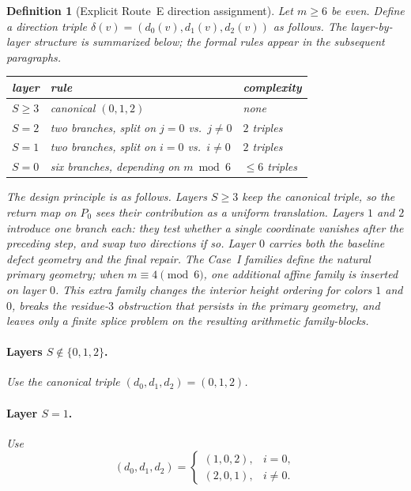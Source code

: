 \documentclass[11pt]{article}
\newtheorem{definition}{Definition}
\begin{document}
\begin{definition}[Explicit Route~E direction assignment]\label{def:routeE}
Let $m\ge 6$ be even. Define a direction triple $\delta(v)=(d_0(v),d_1(v),d_2(v))$ as follows.
The layer-by-layer structure is summarized below; the formal rules appear in the subsequent paragraphs.

\smallskip
\begin{center}
\footnotesize
\begin{tabular}{@{}lll@{}}
\toprule
layer & rule & complexity \\
\midrule
$S\ge 3$ & canonical $(0,1,2)$ & none \\
$S=2$ & two branches, split on $j=0$ vs.\ $j\ne 0$ & $2$ triples \\
$S=1$ & two branches, split on $i=0$ vs.\ $i\ne 0$ & $2$ triples \\
$S=0$ & six branches, depending on $m\bmod 6$ & $\le 6$ triples \\
\bottomrule
\end{tabular}
\end{center}
\smallskip

\noindent
The design principle is as follows.
Layers $S\ge 3$ keep the canonical triple, so the return map on $P_0$ sees their contribution as a uniform translation.
Layers $1$ and $2$ introduce one branch each: they test whether a single coordinate vanishes after the preceding step, and swap two directions if so.
Layer $0$ carries both the baseline defect geometry and the final repair.
The Case~I families define the natural primary geometry; when $m\equiv 4\pmod 6$, one additional affine family is inserted on layer $0$.
This extra family changes the interior height ordering for colors $1$ and $0$, breaks the residue-$3$ obstruction that persists in the primary geometry, and leaves only a finite splice problem on the resulting arithmetic family-blocks.

\paragraph{Layers $S\notin\{0,1,2\}$.}
Use the canonical triple $(d_0,d_1,d_2)=(0,1,2)$.

\paragraph{Layer $S=1$.}
Use
\[
(d_0,d_1,d_2)=
\begin{cases}
(1,0,2), & i=0,\\
(2,0,1), & i\ne 0.
\end{cases}
\]


\end{definition}
\end{document}
